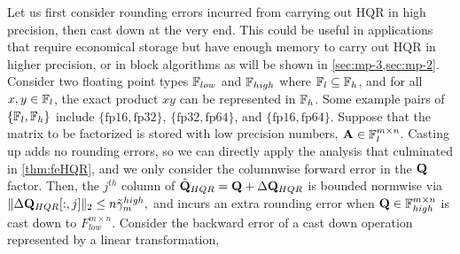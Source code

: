 Let us first consider rounding errors incurred from carrying out HQR in high precision, then cast down at the very end.
This could be useful in applications that require economical storage but have enough memory to carry out HQR in higher precision, or in block algorithms as will be shown in \cref{sec:mp-3,sec:mp-2}.
Consider two floating point types $\mathbb{F}_{low}$ and $\mathbb{F}_{high}$ where $\mathbb{F}_{l}\subseteq \mathbb{F}_{h}$, and for all $x,y\in\mathbb{F}_{l}$, the exact product $xy$ can be represented in $\mathbb{F}_{h}$.
Some example pairs of $\{\mathbb{F}_{l}, \mathbb{F}_{h}\}$ include $\{\text{fp16}, \text{fp32}\}$, $\{\text{fp32}, \text{fp64}\}$, and $\{\text{fp16}, \text{fp64}\}$.
Suppose that the matrix to be factorized is stored with low precision numbers, $\mathbf{A}\in\mathbb{F}_{l}^{m\times n}$.
Casting up adds no rounding errors, so we can directly apply the analysis that culminated in \cref{thm:feHQR}, and we only consider the columnwise forward error in the $\mathbf{Q}$ factor.
Then, the $j^{th}$ column of $\hat{\mathbf{Q}}_{HQR} = \mathbf{Q} + \Delta \mathbf{Q}_{HQR}$ is bounded normwise via $\|\Delta \mathbf{Q}_{HQR}[:,j]\|_2 \leq n\tilde{\gamma}_{m}^{high},$ and incurs an extra rounding error when $\mathbf{Q}\in\mathbb{F}_{high}^{m\times n}$ is cast down to $F_{low}^{m\times n}$.
Consider the backward error of a cast down operation represented by a linear transformation, 

